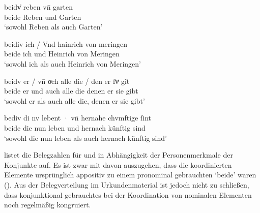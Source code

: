 \begin{exe}
\ex \label{ex:caokonj2ctrl}
	\begin{xlist}
	\ex \label{ex:caokonj2ctrl_1}
		\gll beidv̍ reben vn̄ garten \\
			beide Reben und Garten \\
		\trans `sowohl Reben als auch Garten'
			\parencites(Nr.~2353, Basel, 1296)[462,28--29]{cao3}

	\ex \label{ex:caokonj2ctrl_2}
		\gll beidiv ich / Vnd hainrich von meringen \\
			beide ich {} und Heinrich von Meringen \\
		\trans `sowohl ich als auch Heinrich von Meringen'
			\parencites(Nr.~1347, Kl.~Steingaden, Kr.~Weilheim-Schongau, 1291)[578,25]{cao1}

	\ex \label{ex:caokonj2ctrl_3}
		\gll beidv er / vn̄ oͮch alle die / den er ſvͥ gît \\
			beide er {} und auch alle die {} denen er sie gibt \\
		\trans `sowohl er als auch alle die, denen er sie gibt'
			\parencites(Nr.~1566, Hüfingen, Schwarzwald-Baar-Kr., 1292)[717,18]{cao2}

	\ex \label{ex:caokonj2ctrl_4}
		\gll bediv di nv lebent · vn̄ hernahe chvmftige ſint \\
			beide die nun leben {} und hernach künftig sind \\
		\trans `sowohl die nun leben als auch hernach künftig sind'
			\parencites(Nr.~1352, Wien, 1291)[580,8]{cao2}
	\end{xlist}
\end{exe}

 listet die Belegzahlen für  und
 in Abhängigkeit der Personenmerkmale der Konjunkte auf. Es ist
zwar mit \citet[626]{ksw2} davon auszugehen, dass die koordinierten Elemente
ursprünglich appositiv zu einem pronominal gebrauchten `beide'
waren (). Aus der Belegverteilung im
Urkundenmaterial ist jedoch nicht  zu schließen, dass konjunktional
gebrauchtes  bei der Koordination von nominalen Elementen noch
regelmäßig kongruiert.

